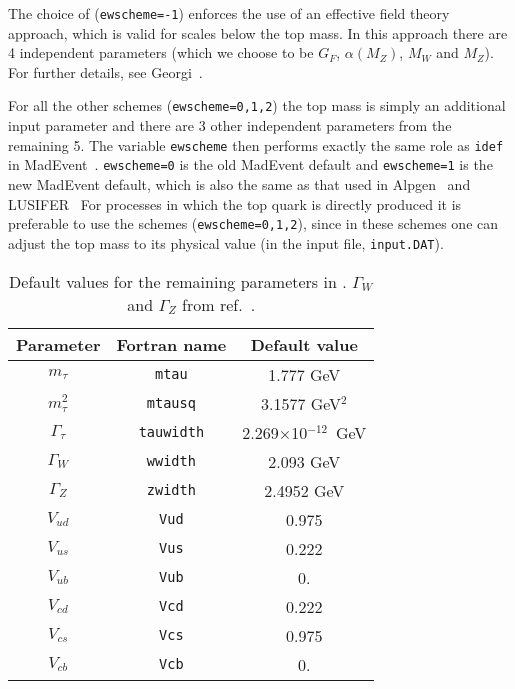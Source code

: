 \documentclass[12pt]{article}
\begin{document}
The choice of ({\tt ewscheme=-1}) enforces the use of an effective field
theory approach, which is valid for scales below the top mass. In this
approach there are 4 independent parameters (which we choose to be
$G_F$, $\alpha(M_Z)$, $M_W$ and $M_Z$). For further details,
see Georgi~\cite{Georgi:1991ci}.

For all the other schemes ({\tt ewscheme=0,1,2}) the top mass is simply
an additional input parameter and there are 3 other independent
parameters from the remaining 5. The variable {\tt ewscheme} then performs
exactly the same role as {\tt idef} in MadEvent~\cite{Maltoni:2002qb}.
{\tt ewscheme=0} is the old MadEvent default and {\tt ewscheme=1} is the
new MadEvent default, which is also the same as that used in 
Alpgen~\cite{Alpgen} and LUSIFER~\cite{Lusifer} 
For processes in which the top quark is directly produced  it is 
preferable to use  the schemes ({\tt ewscheme=0,1,2}), since in these schemes
one can adjust the top mass to its physical value (in the input file,
{\tt input.DAT}).

\begin{table}
\begin{center}
\begin{tabular}{|c|c|c|} \hline
Parameter & Fortran name & Default value \\ 
\hline
$m_\tau$         & {\tt mtau}      & 1.777 GeV            \\
$m^2_\tau$& {\tt mtausq}  & 3.1577 GeV$^2$     \\
$\Gamma_\tau$    & {\tt tauwidth}& 2.269$\times$10$^{-12}$~GeV \\
$\Gamma_W$       & {\tt wwidth}  & 2.093 GeV               \\
$\Gamma_Z$       & {\tt zwidth}  & 2.4952 GeV               \\
$V_{ud}$         & {\tt Vud}     & 0.975                  \\
$V_{us}$         & {\tt Vus}     & 0.222             \\
$V_{ub}$         & {\tt Vub}     & 0.                     \\
$V_{cd}$         & {\tt Vcd}     & 0.222             \\
$V_{cs}$         & {\tt Vcs}     & 0.975                  \\
$V_{cb}$         & {\tt Vcb}     & 0.                     \\
\hline
\end{tabular}
\caption{Default values for the remaining parameters in \MCFM.
$\Gamma_W$ and $\Gamma_Z$ from ref.~\cite{Amsler:2008zzb}.}
\label{default} 
\end{center}
\end{table}
\end{document}
